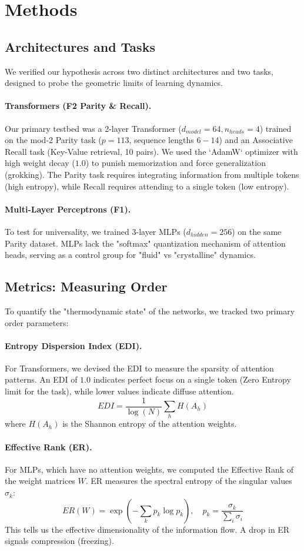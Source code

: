 \section{Methods}\label{sec:methods}

\subsection{Architectures and Tasks}
We verified our hypothesis across two distinct architectures and two tasks, designed to probe the geometric limits of learning dynamics.

\paragraph{Transformers (F2 Parity \& Recall).} 
Our primary testbed was a 2-layer Transformer ($d_{model}=64, n_{heads}=4$) trained on the mod-2 Parity task ($p=113$, sequence lengths $6-14$) and an Associative Recall task (Key-Value retrieval, 10 pairs). We used the `AdamW` optimizer with high weight decay ($1.0$) to punish memorization and force generalization (grokking). The Parity task requires integrating information from multiple tokens (high entropy), while Recall requires attending to a single token (low entropy).

\paragraph{Multi-Layer Perceptrons (F1).}
To test for universality, we trained 3-layer MLPs ($d_{hidden}=256$) on the same Parity dataset. MLPs lack the "softmax" quantization mechanism of attention heads, serving as a control group for "fluid" vs "crystalline" dynamics.

\subsection{Metrics: Measuring Order}
To quantify the "thermodynamic state" of the networks, we tracked two primary order parameters:

\paragraph{Entropy Dispersion Index (EDI).}
For Transformers, we devised the EDI to measure the sparsity of attention patterns. An EDI of $1.0$ indicates perfect focus on a single token (Zero Entropy limit for the task), while lower values indicate diffuse attention.
\[ EDI = \frac{1}{\log(N)} \sum_h H(A_h) \]
where $H(A_h)$ is the Shannon entropy of the attention weights.

\paragraph{Effective Rank (ER).}
For MLPs, which have no attention weights, we computed the Effective Rank of the weight matrices $W$. ER measures the spectral entropy of the singular values $\sigma_k$:
\[ ER(W) = \exp\left(-\sum_k p_k \log p_k\right), \quad p_k = \frac{\sigma_k}{\sum_i \sigma_i} \]
This tells us the effective dimensionality of the information flow. A drop in ER signals compression (freezing).
